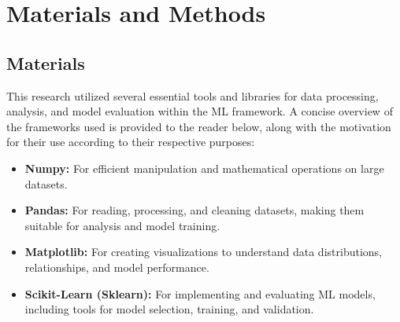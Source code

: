 \section{Materials and Methods}

\subsection{Materials}
This research utilized several essential tools and libraries for data processing, analysis, and model evaluation within the ML framework.
A concise overview of the frameworks used is provided to the reader below, along with the motivation for their use according to their respective purposes:


\begin{itemize}
    \item \textbf{Numpy:} For efficient manipulation and mathematical operations on large datasets.
    \item \textbf{Pandas:} For reading, processing, and cleaning datasets, making them suitable for analysis and model training.
    \item \textbf{Matplotlib:} For creating visualizations to understand data distributions, relationships, and model performance.
    \item \textbf{Scikit-Learn (Sklearn):} For implementing and evaluating ML models, including tools for model selection, training, and validation.
\end{itemize}


